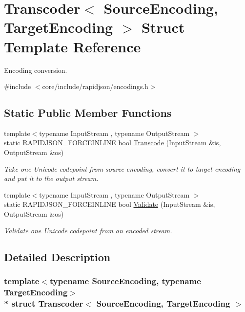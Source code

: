 \hypertarget{structTranscoder}{}\section{Transcoder$<$ Source\+Encoding, Target\+Encoding $>$ Struct Template Reference}
\label{structTranscoder}


Encoding conversion.  




{\ttfamily \#include $<$core/include/rapidjson/encodings.\+h$>$}

\subsection*{Static Public Member Functions}
\begin{DoxyCompactItemize}
\item 
{\footnotesize template$<$typename Input\+Stream , typename Output\+Stream $>$ }\\static R\+A\+P\+I\+D\+J\+S\+O\+N\+\_\+\+F\+O\+R\+C\+E\+I\+N\+L\+I\+NE bool \hyperlink{structTranscoder_a0ea2edfe35784ebf1063921d2bd5fb66}{Transcode} (Input\+Stream \&is, Output\+Stream \&os)
\begin{DoxyCompactList}\small\item\em Take one Unicode codepoint from source encoding, convert it to target encoding and put it to the output stream. \end{DoxyCompactList}\item 
{\footnotesize template$<$typename Input\+Stream , typename Output\+Stream $>$ }\\static R\+A\+P\+I\+D\+J\+S\+O\+N\+\_\+\+F\+O\+R\+C\+E\+I\+N\+L\+I\+NE bool \hyperlink{structTranscoder_a8a64aa837f7962894a99f63232472543}{Validate} (Input\+Stream \&is, Output\+Stream \&os)
\begin{DoxyCompactList}\small\item\em Validate one Unicode codepoint from an encoded stream. \end{DoxyCompactList}\end{DoxyCompactItemize}


\subsection{Detailed Description}
\subsubsection*{template$<$typename Source\+Encoding, typename Target\+Encoding$>$\\*
struct Transcoder$<$ Source\+Encoding, Target\+Encoding $>$}

